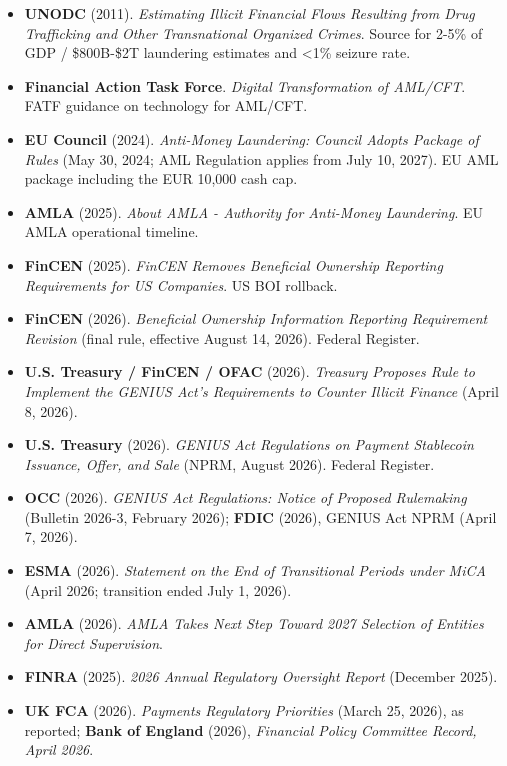 \documentclass[11pt,letterpaper]{article}
\begin{document}
\begin{itemize}[leftmargin=1.5em]
  \item \textbf{UNODC} (2011). \textit{Estimating Illicit Financial Flows Resulting from Drug Trafficking and Other Transnational Organized Crimes}. Source for 2-5\% of GDP / \$800B-\$2T laundering estimates and <1\% seizure rate.
  \item \textbf{Financial Action Task Force}. \textit{Digital Transformation of AML/CFT}. FATF guidance on technology for AML/CFT.
  \item \textbf{EU Council} (2024). \textit{Anti-Money Laundering: Council Adopts Package of Rules} (May 30, 2024; AML Regulation applies from July 10, 2027). EU AML package including the EUR 10,000 cash cap.
  \item \textbf{AMLA} (2025). \textit{About AMLA - Authority for Anti-Money Laundering}. EU AMLA operational timeline.
  \item \textbf{FinCEN} (2025). \textit{FinCEN Removes Beneficial Ownership Reporting Requirements for US Companies}. US BOI rollback.
  \item \textbf{FinCEN} (2026). \textit{Beneficial Ownership Information Reporting Requirement Revision} (final rule, effective August 14, 2026). Federal Register.
  \item \textbf{U.S. Treasury / FinCEN / OFAC} (2026). \textit{Treasury Proposes Rule to Implement the GENIUS Act's Requirements to Counter Illicit Finance} (April 8, 2026).
  \item \textbf{U.S. Treasury} (2026). \textit{GENIUS Act Regulations on Payment Stablecoin Issuance, Offer, and Sale} (NPRM, August 2026). Federal Register.
  \item \textbf{OCC} (2026). \textit{GENIUS Act Regulations: Notice of Proposed Rulemaking} (Bulletin 2026-3, February 2026); \textbf{FDIC} (2026), GENIUS Act NPRM (April 7, 2026).
  \item \textbf{ESMA} (2026). \textit{Statement on the End of Transitional Periods under MiCA} (April 2026; transition ended July 1, 2026).
  \item \textbf{AMLA} (2026). \textit{AMLA Takes Next Step Toward 2027 Selection of Entities for Direct Supervision}.
  \item \textbf{FINRA} (2025). \textit{2026 Annual Regulatory Oversight Report} (December 2025).
  \item \textbf{UK FCA} (2026). \textit{Payments Regulatory Priorities} (March 25, 2026), as reported; \textbf{Bank of England} (2026), \textit{Financial Policy Committee Record, April 2026}.

\end{itemize}
\end{document}

